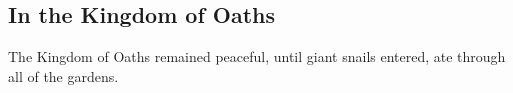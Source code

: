 \subsection{In the Kingdom of Oaths}


The Kingdom of Oaths remained peaceful, until giant snails entered, ate through all of the gardens.



